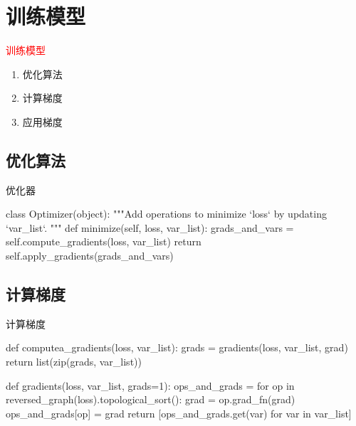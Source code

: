 \section{训练模型}
\label{sec:train-model}

\begin{frame}
  \begin{center}
    \Huge{\textcolor{red}{训练模型}}
  \end{center}

  \begin{enumerate}
    \item \alert{优化算法}
    \item \alert{计算梯度}
    \item \alert{应用梯度}    
  \end{enumerate}    
\end{frame}

\subsection{优化算法}

\begin{frame}[fragile]{优化器}
  \begin{python} 
class Optimizer(object):
  """Add operations to minimize `loss` by updating `var\_list`.
  """
  def minimize(self, loss, var_list):
    grads_and_vars = self.compute_gradients(loss, var_list)
    return self.apply_gradients(grads_and_vars)
  \end{python}
\end{frame}

\subsection{计算梯度}

\begin{frame}[fragile]{计算梯度}
  \begin{python} 
def computea_gradients(loss, var_list):
  grads = gradients(loss, var_list, grad)
  return list(zip(grads, var_list))

def gradients(loss, var_list, grads=1):
  ops_and_grads = {}
  for op in reversed_graph(loss).topological_sort():
    grad = op.grad_fn(grad)
    ops_and_grads[op] = grad
  return [ops_and_grads.get(var) for var in var_list]
  \end{python}
\end{frame}

